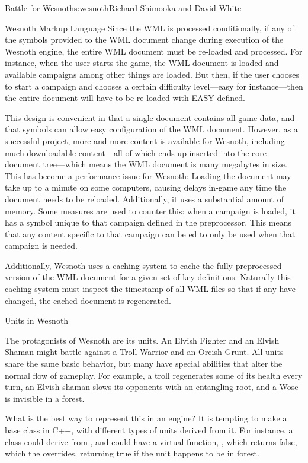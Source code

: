 \begin{aosachapter}{Battle for Wesnoth}{s:wesnoth}{Richard Shimooka and David White}
\begin{aosasect1}{Wesnoth Markup Language}
Since the WML is processed conditionally, if any of the
symbols provided to the WML document change during execution of the
Wesnoth engine, the entire WML document must be re-loaded and
processed. For instance, when the user starts the game, the WML
document is loaded and available campaigns among other things are
loaded. But then, if the user chooses to start a campaign and chooses
a certain difficulty level---easy for instance---then the entire
document will have to be re-loaded with EASY defined.

This design is convenient in that a single document contains all game
data, and that symbols can allow easy configuration of the WML
document. However, as a successful project, more and more content is
available for Wesnoth, including much downloadable content---all of
which ends up inserted into the core document tree---which means the
WML document is many megabytes in size. This has become a performance
issue for Wesnoth: Loading the document may take up to a minute on
some computers, causing delays in-game any time the document needs to
be reloaded. Additionally, it uses a substantial amount of
memory. Some measures are used to counter this: when a campaign is
loaded, it has a symbol unique to that campaign defined in the
preprocessor. This means that any content specific to that campaign
can be ed to only be used when that campaign is needed.

Additionally, Wesnoth uses a caching system to cache the fully
preprocessed version of the WML document for a given set of key
definitions. Naturally this caching system must inspect the timestamp
of all WML files so that if any have changed, the cached document is
regenerated.

\end{aosasect1}

\begin{aosasect1}{Units in Wesnoth}

The protagonists of Wesnoth are its units. An Elvish Fighter and an
Elvish Shaman might battle against a Troll Warrior and an Orcish
Grunt.  All units share the same basic behavior, but many have special
abilities that alter the normal flow of gameplay. For example, a troll
regenerates some of its health every turn, an Elvish shaman slows its
opponents with an entangling root, and a Wose is invisible in a
forest. 

What is the best way to represent this in an engine? It is
tempting to make a base  class in C++, with different types
of units derived from it. For instance, a  class could
derive from , and  could have a virtual
function, , which returns false, which
the  overrides, returning true if the unit happens to
be in forest.


\end{aosasect1}
\end{aosachapter}
